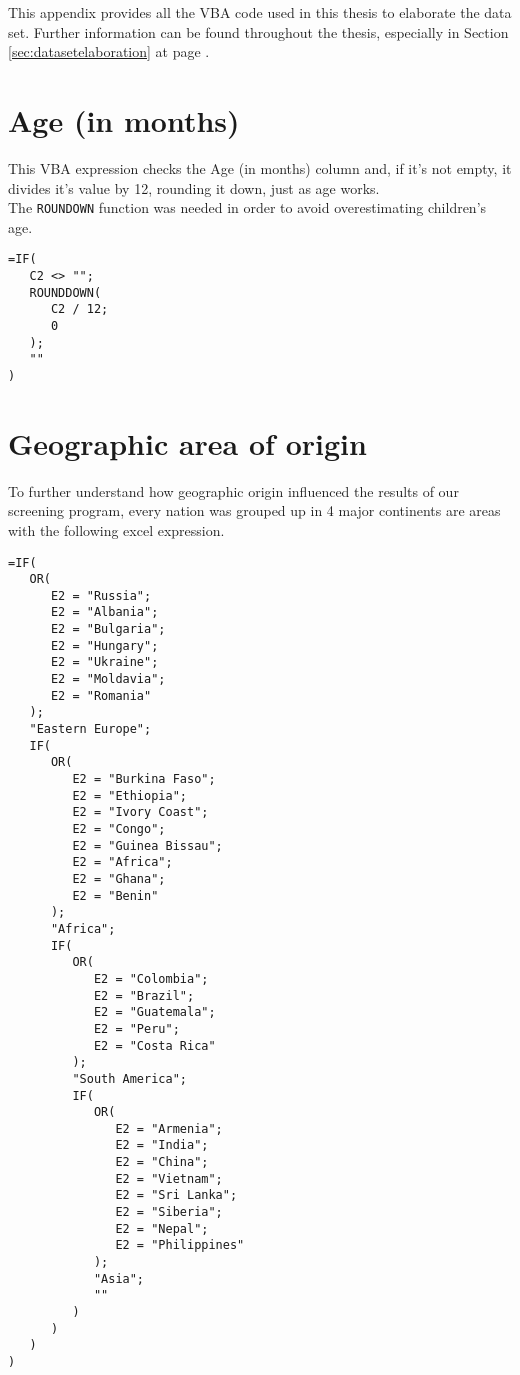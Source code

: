 \label{chap:appendixvbaexpressions}
This appendix provides all the VBA code used in this thesis to elaborate the data set. Further information can be found throughout the thesis, especially in Section \ref{sec:datasetelaboration} at page \pageref{sec:datasetelaboration}.

\section{Age (in months)}\label{sec:ageinmonths}
This VBA expression checks the Age (in months) column and, if it's not empty, it divides it's value by 12, rounding it down, just as age works.\\
The \texttt{ROUNDOWN} function was needed in order to avoid overestimating children's age.

\begin{minipage}{\linewidth}
\begin{lstlisting}
=IF(
   C2 <> "";
   ROUNDDOWN(
      C2 / 12;
      0
   );
   ""
)
\end{lstlisting}
\end{minipage}

\section{Geographic area of origin}\label{sec:geographicarea}
To further understand how geographic origin influenced the results of our screening program, every nation was grouped up in 4 major continents are areas with the following excel expression.

\begin{lstlisting}
=IF(
   OR(
      E2 = "Russia";
      E2 = "Albania";
      E2 = "Bulgaria";
      E2 = "Hungary";
      E2 = "Ukraine";
      E2 = "Moldavia";
      E2 = "Romania"
   );
   "Eastern Europe";
   IF(
      OR(
         E2 = "Burkina Faso";
         E2 = "Ethiopia";
         E2 = "Ivory Coast";
         E2 = "Congo";
         E2 = "Guinea Bissau";
         E2 = "Africa";
         E2 = "Ghana";
         E2 = "Benin"
      );
      "Africa";
      IF(
         OR(
            E2 = "Colombia";
            E2 = "Brazil";
            E2 = "Guatemala";
            E2 = "Peru";
            E2 = "Costa Rica"
         );
         "South America";
         IF(
            OR(
               E2 = "Armenia";
               E2 = "India";
               E2 = "China";
               E2 = "Vietnam";
               E2 = "Sri Lanka";
               E2 = "Siberia";
               E2 = "Nepal";
               E2 = "Philippines"
            );
            "Asia";
            ""
         )
      )
   )
)
\end{lstlisting}

